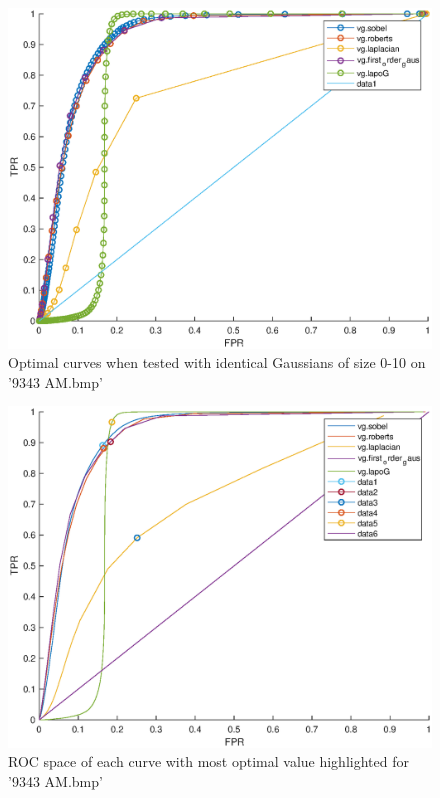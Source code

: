 \documentclass{Resources/UoBLab1}
\begin{document}
\begin{figure}[h]
    \begin{center}
		\includegraphics[scale=0.4]{Resources/images/all_dots.eps}
		\caption{Optimal curves when tested with identical Gaussians of size 0-10 on '9343 AM.bmp'}
        \label{fig:1to10}
    \end{center}
\end{figure}
\begin{figure}[h]
    \centering
    \includegraphics[scale=0.4]{Resources/images/best.eps}
    \caption{ROC space of each curve with most optimal value highlighted for '9343 AM.bmp'}
    \label{fig:best}
\end{figure}
\end{document}
